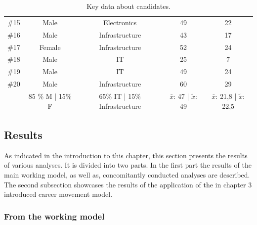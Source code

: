 \begin{table}[!hbt]
\begin{tabular}{|c|c|c|c|c|}
    \#15 & Male                   & Electronics                    & 49                & 22                      \\\hdashline
    \#16 & Male                   & Infrastructure                 & 43                & 17                      \\\hdashline
    \#17 & Female                 & Infrastructure                 & 52                & 24                      \\\hdashline
    \#18 & Male                   & IT                             & 25                & 7                       \\\hdashline
    \#19 & Male                   & IT                             & 49                & 24                      \\\hdashline
    \#20 & Male                   & Infrastructure                 & 60                & 29                      \\ \hline
         & 85 \% M | 15\% F & 65\% IT | 15\% Infrastructure  & $\bar{x}$: 47 | $\tilde{x}$: 49 & $\bar{x}$: 21,8 | $\tilde{x}$: 22,5 \\  \hline
    \end{tabular}
    \caption[Key data about candidates]{Key data about candidates.}
    \label{tab:candid}
\end{table}

\clearpage







\subsection{Results}
As indicated in the introduction to this chapter, this section presents the results of various analyses. It is divided into two parts. In the first part the results of the main working model, as well as, concomitantly conducted analyses are described. The second subsection showcases the results of the application of the in chapter 3 introduced career movement model.

\subsubsection{From the working model}



